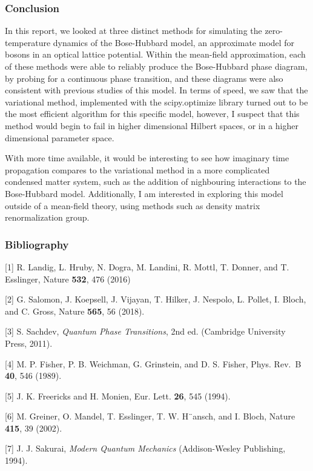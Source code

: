 \documentclass[11pt]{article}
\begin{document}
    \hypertarget{conclusion}{%
\subsubsection{Conclusion}\label{conclusion}}

    In this report, we looked at three distinct methods for simulating the
zero-temperature dynamics of the Bose-Hubbard model, an approximate
model for bosons in an optical lattice potential. Within the mean-field
approximation, each of these methods were able to reliably produce the
Bose-Hubbard phase diagram, by probing for a continuous phase
transition, and these diagrams were also consistent with previous
studies of this model. In terms of speed, we saw that the variational
method, implemented with the scipy.optimize library turned out to be the
most efficient algorithm for this specific model, however, I suspect
that this method would begin to fail in higher dimensional Hilbert
spaces, or in a higher dimensional parameter space.

With more time available, it would be interesting to see how imaginary
time propagation compares to the variational method in a more
complicated condensed matter system, such as the addition of nighbouring
interactions to the Bose-Hubbard model. Additionally, I am interested in
exploring this model outside of a mean-field theory, using methods such
as density matrix renormalization group.

    \hypertarget{bibliography}{%
\subsubsection{Bibliography}\label{bibliography}}

    {[}1{]} R. Landig, L. Hruby, N. Dogra, M. Landini, R. Mottl, T. Donner,
and T. Esslinger, Nature \textbf{532}, 476 (2016)

{[}2{]} G. Salomon, J. Koepsell, J. Vijayan, T. Hilker, J. Nespolo, L.
Pollet, I. Bloch, and C. Gross, Nature \textbf{565}, 56 (2018).

{[}3{]} S. Sachdev, \emph{Quantum Phase Transitions}, 2nd ed. (Cambridge
University Press, 2011).

{[}4{]} M. P. Fisher, P. B. Weichman, G. Grinstein, and D. S. Fisher,
Phys. Rev.~B \textbf{40}, 546 (1989).

{[}5{]} J. K. Freericks and H. Monien, Eur. Lett. \textbf{26}, 545
(1994).

{[}6{]} M. Greiner, O. Mandel, T. Esslinger, T. W. H¨ansch, and I.
Bloch, Nature \textbf{415}, 39 (2002).

{[}7{]} J. J. Sakurai, \emph{Modern Quantum Mechanics} (Addison-Wesley
Publishing, 1994).


    
    
    
    
\end{document}
